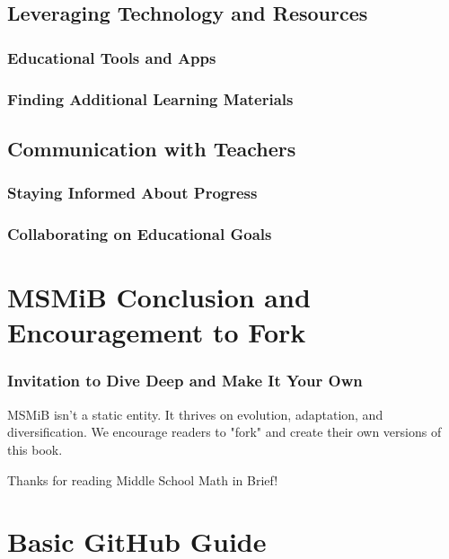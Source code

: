 \documentclass{book}
\begin{document}
\section{Leveraging Technology and Resources}
\subsection{Educational Tools and Apps}
\subsection{Finding Additional Learning Materials}


\section{Communication with Teachers}
\subsection{Staying Informed About Progress}
\subsection{Collaborating on Educational Goals}


\chapter{MSMiB Conclusion and Encouragement to Fork}
\subsection*{Invitation to Dive Deep and Make It Your Own}
MSMiB isn't a static entity. It thrives on evolution, adaptation, and diversification. We encourage readers to "fork" and create their own versions of this book. 

Thanks for reading Middle School Math in Brief!


\clearpage
{}
\appendix
\renewcommand{\thechapter}{\Roman{chapter}} %

\chapter{Basic GitHub Guide}
\end{document}
